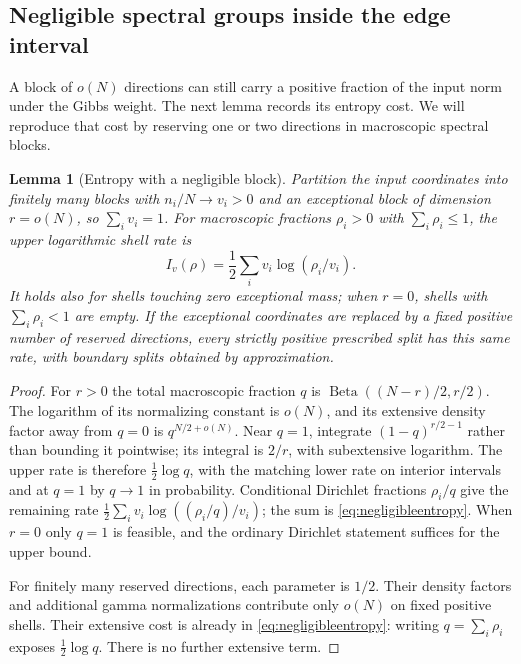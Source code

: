 \documentclass[11pt]{article}
\numberwithin{equation}{section}
\newtheorem{lemma}[theorem]{Lemma}
\theoremstyle{definition}
\begin{document}
\subsection{Negligible spectral groups inside the edge interval}
A block of $o(N)$ directions can still carry a positive fraction of the input norm under the Gibbs weight. The next lemma records its entropy cost. We will reproduce that cost by reserving one or two directions in macroscopic spectral blocks.

\begin{lemma}[Entropy with a negligible block]\label{lem:negligibleentropy}
Partition the input coordinates into finitely many blocks with $n_i/N\to v_i>0$ and an exceptional block of dimension $r=o(N)$, so $\sum_i v_i=1$. For macroscopic fractions $\rho_i>0$ with $\sum_i\rho_i\le1$, the upper logarithmic shell rate is
\begin{equation}\label{eq:negligibleentropy}
I_v(\rho)=\frac12\sum_i v_i\log(\rho_i/v_i).
\end{equation}
It holds also for shells touching zero exceptional mass; when $r=0$, shells with $\sum_i\rho_i<1$ are empty. If the exceptional coordinates are replaced by a fixed positive number of reserved directions, every strictly positive prescribed split has this same rate, with boundary splits obtained by approximation.
\end{lemma}
\begin{proof}
For $r>0$ the total macroscopic fraction $q$ is $\operatorname{Beta}((N-r)/2,r/2)$. The logarithm of its normalizing constant is $o(N)$, and its extensive density factor away from $q=0$ is $q^{N/2+o(N)}$. Near $q=1$, integrate $(1-q)^{r/2-1}$ rather than bounding it pointwise; its integral is $2/r$, with subextensive logarithm. The upper rate is therefore $\frac12\log q$, with the matching lower rate on interior intervals and at $q=1$ by $q\to1$ in probability. Conditional Dirichlet fractions $\rho_i/q$ give the remaining rate $\frac12\sum_i v_i\log((\rho_i/q)/v_i)$; the sum is \eqref{eq:negligibleentropy}. When $r=0$ only $q=1$ is feasible, and the ordinary Dirichlet statement suffices for the upper bound.

For finitely many reserved directions, each parameter is $1/2$. Their density factors and additional gamma normalizations contribute only $o(N)$ on fixed positive shells. Their extensive cost is already in \eqref{eq:negligibleentropy}: writing $q=\sum_i\rho_i$ exposes $\frac12\log q$. There is no further extensive term.
\end{proof}
\end{document}
